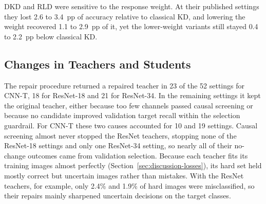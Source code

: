 \documentclass[review,number,sort&compress]{elsarticle}
\theoremstyle{definition}
\begin{document}
DKD and RLD were sensitive to the response weight. At their published
settings they lost 2.6 to 3.4~pp of accuracy relative to classical KD,
and lowering the weight recovered 1.1 to 2.9~pp of it, yet the
lower-weight variants still stayed 0.4 to 2.2~pp below classical KD.
\FloatBarrier
\subsection{Changes in Teachers and Students}
\label{sec:teacher-student-changes}

The repair procedure returned a repaired teacher in 23 of the 52
settings for CNN-T, 18 for ResNet-18 and 21 for ResNet-34. In the
remaining settings it kept the original teacher, either because too
few channels passed causal screening or because no candidate improved
validation target recall within the selection guardrail. For CNN-T these
two causes accounted for 10 and 19 settings. Causal screening almost
never stopped the ResNet teachers, stopping none of the ResNet-18
settings and only one ResNet-34 setting, so nearly all of their
no-change outcomes came from validation selection. Because each teacher
fits its training images almost perfectly
(Section~\ref{sec:discussion-losses}), its hard set held mostly correct
but uncertain images rather than mistakes. With the ResNet teachers, for
example, only 2.4\% and 1.9\% of hard images were misclassified, so their
repairs mainly sharpened uncertain decisions on the target classes.
\end{document}

